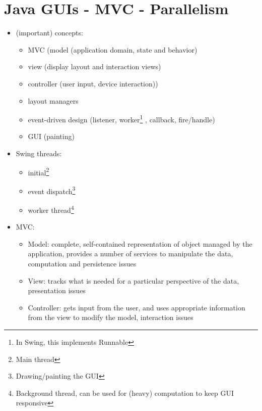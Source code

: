 \documentclass[a4paper]{article}
\begin{document}
\section{Java GUIs - MVC - Parallelism}
\begin{itemize}
\item (important) concepts: 
\begin{itemize}
 \item MVC (model (application domain, state and behavior)
\item view (display layout and interaction views)
\item controller (user input, device interaction))
\item layout managers
\item event-driven design  (listener, worker\footnote{In Swing, this implements Runnable} , callback, fire/handle)
\item GUI (painting)
\end{itemize}
\item Swing threads: 
\begin{itemize}
\item initial\footnote{Main thread}
\item event dispatch\footnote{Drawing/painting the GUI}
\item worker thread\footnote{Background thread, can be used for (heavy) computation to keep GUI responsive}
\end{itemize}
\item MVC: 
\begin{itemize}
\item Model: complete, self-contained representation of object managed by the application, provides a number of services to manipulate the data, computation and persistence issues
\item View: tracks what is needed for a particular perspective of the data, presentation issues
\item Controller: gets input from the user, and uses appropriate information from the view to modify the model, interaction issues
\end{itemize}
\end{itemize}
\end{document}
